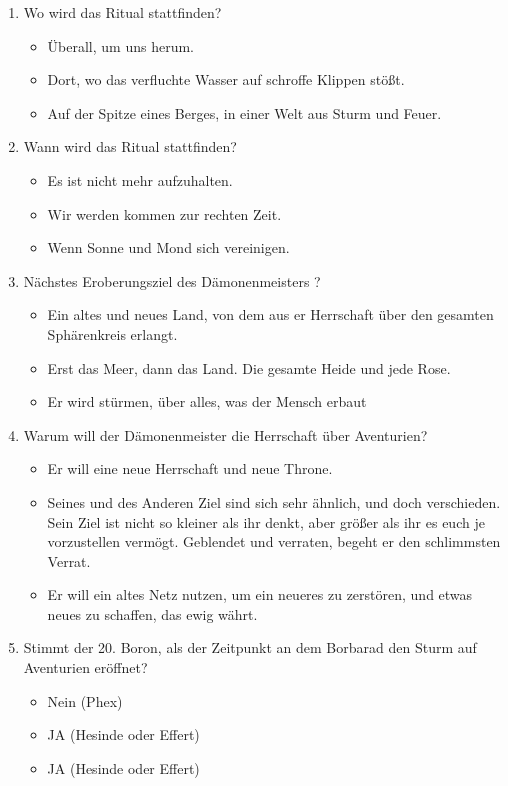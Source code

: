 \begin{enumerate}
\item Wo wird das Ritual stattfinden?
\begin{itemize}
\item Überall, um uns herum.
\item Dort, wo das verfluchte Wasser auf schroffe Klippen stößt.
\item Auf der Spitze eines Berges, in einer Welt aus Sturm und Feuer.
\end{itemize}
\item Wann wird das Ritual stattfinden?
\begin{itemize}
\item Es ist nicht mehr aufzuhalten.
\item Wir werden kommen zur rechten Zeit.
\item Wenn Sonne und Mond sich vereinigen.
\end{itemize}
\item Nächstes Eroberungsziel des Dämonenmeisters ?
\begin{itemize}
\item Ein altes und neues Land, von dem aus er Herrschaft über den gesamten Sphärenkreis erlangt.
\item Erst das Meer, dann das Land. Die gesamte Heide und jede Rose.
\item Er wird stürmen, über alles, was der Mensch erbaut
\end{itemize}
\item Warum will der Dämonenmeister die Herrschaft über Aventurien?
\begin{itemize}
\item Er will eine neue Herrschaft und neue Throne.
\item Seines und des Anderen Ziel sind sich sehr ähnlich, und doch verschieden. Sein Ziel ist nicht so kleiner als ihr denkt, aber größer als ihr es euch je vorzustellen vermögt. Geblendet und verraten, begeht er den schlimmsten Verrat.
\item Er will ein altes Netz nutzen, um ein neueres zu zerstören, und etwas neues zu schaffen, das ewig währt.
\end{itemize}
\item Stimmt der 20. Boron, als der Zeitpunkt an dem Borbarad den Sturm auf Aventurien eröffnet?
\begin{itemize}
\item Nein (Phex)
\item JA (Hesinde oder Effert)
\item JA (Hesinde oder Effert)

\end{itemize}
\end{enumerate}
